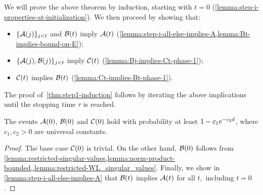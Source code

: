 We will prove the above theorem by induction, starting with $t=0$ (\cref{lemma:step-i-properties-at-initialization}).
We then proceed by showing that:
\begin{itemize}
  \item $\{\mathcal{A}(j)\}_{j < t}$ and $\mathcal{B}(t)$ imply $\mathcal{A}(t)$ (\cref{lemma:step-i-all-else-implies-A,lemma:Bt-implies-bound-on-E});
  \item $\{\mathcal{A}(j), \mathcal{B}(j)\}_{j < t}$ imply $\mathcal{C}(t)$ (\cref{lemma:Bj-implies-Ct-phase-1});
  \item $\mathcal{C}(t)$ implies $\mathcal{B}(t)$ (\cref{lemma:Ct-implies-Bt-phase-1}).
\end{itemize}
The proof of~\cref{thm:step1-induction} follows by iterating the above implications
until the stopping time $\tau$ is reached.
\begin{lemma}[Initialization]
    \label{lemma:step-i-properties-at-initialization}
    The events $\mathcal{A}(0)$, $\mathcal{B}(0)$ and $\mathcal{C}(0)$ hold with probability at least $1-c_1 e^{-c_2 d}$, where $c_1, c_2 > 0$ are universal constants.
\end{lemma}
\begin{proof}
    The base case $\mathcal{C}(0)$ is trivial. On the other hand, $\mathcal{B}(0)$ follows from
    \cref{lemma:restricted-singular-values,lemma:norm-product-bounded,,lemma:restricted-WL_singular_values}. 
    Finally, we show in \cref{lemma:step-i-all-else-implies-A}
    that $\mathcal{B}(t)$ implies $\mathcal{A}(t)$ for all $t,$ including $t = 0$.
\end{proof}


